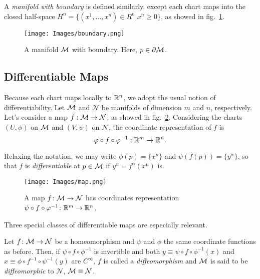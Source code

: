 A \emph{manifold with boundary} is defined similarly, except each chart maps into the closed half-space $H^n = \{ (x^1, \dots, x^n) \in R^n | x^n \geq 0 \}$, as showed in fig.~\ref{fig:boundary}.

\begin{figure}
	\centering
	\texttt{[image: Images/boundary.png]}
	\caption{A manifold $\mathcal{M}$ with boundary. Here, $p \in \partial \mathcal{M}$.}
	\label{fig:boundary}
\end{figure}

\subsection{Differentiable Maps}
Because each chart maps locally to $\mathbb{R}^n$, we adopt the usual notion of differentiability. Let $\mathcal{M}$ and $\mathcal{N} $ be manifolds of dimension $m$ and $n$, respectively. Let's consider a map $f: \mathcal{M} \to \mathcal{N}$, as showed in fig.~\ref{fig:map}. Considering the charts $(U, \phi)$ on $\mathcal{M}$ and $(V,\psi)$ on $\mathcal{N}$, the coordinate representation of $f$ is
\begin{equation}
	\varphi \circ f \circ \varphi^{-1}: \mathbb{R}^m \to \mathbb{R}^n .
\end{equation}

Relaxing the notation, we may write $\phi(p) = \{x^\mu\}$ and $\psi(f(p)) = \{y^\alpha\}$, so that $f$ is \emph{differentiable} at $p \in \mathcal{M}$ if $y^\alpha = f^\alpha(x^\mu)$ is.

\begin{figure}
	\centering
	\texttt{[image: Images/map.png]}
	\caption{A map $f \colon \mathcal{M} \to \mathcal{N}$ has coordinates representation $\psi \circ f \circ \varphi^{-1} \colon \mathbb{R}^m \to \mathbb{R}^n$.}
	\label{fig:map}
\end{figure}

Three special classes of differentiable maps are especially relevant.

\begin{definition}[Diffeomorphism]
	Let $f \colon \mathcal{M} \to \mathcal{N}$ be a homeomorphism and $\psi$ and $\phi$ the same coordinate functions as before. Then, if $\psi \circ f \circ \phi^{-1}$ is invertible and both $y \equiv \psi \circ f \circ \phi^{-1}(x)$ and $x \equiv \phi \circ f^{-1} \circ \psi^{-1}(y)$ are $C^\infty$, $f$ is called a \emph{diffeomorphism} and $\mathcal{M}$ is said to be \emph{diffeomorphic} to $\mathcal{N}$, $\mathcal{M} \equiv \mathcal{N}$.
\end{definition}

